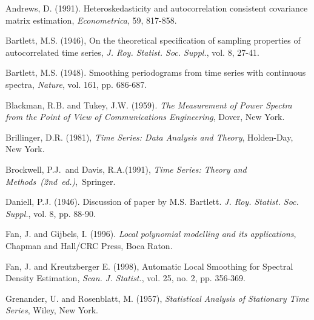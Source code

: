 \documentclass[12p E.Lt,psfig]{article} %
\begin{document}
\begin{thebibliography}{999}

 \bibitem{}  Andrews, D. (1991). Heteroskedasticity and autocorrelation consistent covariance matrix
estimation, {\it  Econometrica}, 59, 817-858.

 \bibitem{}  Bartlett, M.S. (1946), On the theoretical specification of
 sampling  properties of autocorrelated time series, {\it J. Roy. Statist. Soc. Suppl.}, vol. 8, 27-41.

\bibitem{} Bartlett, M.S. (1948). Smoothing periodograms from time series
with continuous spectra, {\it Nature}, vol. 161, pp. 686-687.

\bibitem{} Blackman, R.B. and Tukey, J.W. (1959).
{\it The Measurement of Power Spectra from the Point of View of Communications Engineering}, Dover, New York.

  Brillinger, D.R. (1981),
  {\it Time Series: Data Analysis and Theory},
Holden-Day, New York.



    Brockwell, P.J.~and Davis, R.A.(1991), {\it Time Series: Theory and Methods~(2nd~ed.)},~Springer.



\bibitem{} Daniell, P.J.  (1946).  Discussion of paper by M.S. Bartlett.
{\it J. Roy. Statist. Soc. Suppl.}, vol. 8, pp. 88-90.




\bibitem{}  Fan, J. and Gijbels, I. (1996). {\it
Local polynomial modelling and its applications}, Chapman and Hall/CRC Press, Boca Raton.

\bibitem{}  Fan, J. and Kreutzberger E. (1998), Automatic Local Smoothing for Spectral Density Estimation,
{\it Scan. J. Statist.}, vol. 25, no. 2, pp. 356-369.



 \bibitem{} Grenander, U. and   Rosenblatt, M. (1957), {\it
Statistical Analysis of Stationary Time Series}, Wiley, New York.


\end{thebibliography}
\end{document}
